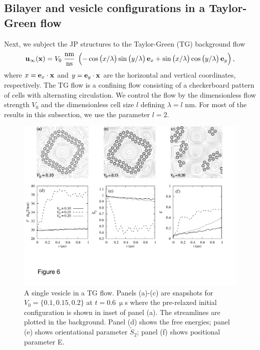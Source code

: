 \documentclass[prb,preprint,showpacs,preprintnumbers,amsmath,amssymb,longbibliography]{revtex4-1}
\newcommand{\xx}{\mathbf{x}}
\newcommand{\uu}{\mathbf{u}}
\begin{document}
\subsection{Bilayer and vesicle configurations in a Taylor-Green flow}
Next, we subject the JP structures to the Taylor-Green (TG) background
flow
\begin{equation}
\label{eq:tg_flow}
\uu_\infty(\xx) = V_0\; \frac{\text{nm}}{\text{ns}}\;
\left(
-\cos\left(x/\lambda\right)
 \sin\left(y/\lambda\right)
         {\bf e}_x
         +\sin\left(x/\lambda\right)
         \cos\left(y/\lambda\right)
             {\bf e}_y\right),
\end{equation}
where $x = {\bf e}_x \cdot \xx$ and $y = {\bf e}_y \cdot \xx$
are the horizontal and vertical coordinates, respectively. 
The TG flow is a confining flow consisting of a checkerboard pattern
of cells with alternating circulation. We control the flow by the
dimensionless flow strength $V_0$ and the dimensionless cell size $l$
defining $\lambda = l$ nm. For most of the results in this subsection,
we use the parameter $l=2$.
%

\begin{figure}
  \begin{center}
    \includegraphics[width=1.0\textwidth]{Figures/Figure6.pdf}        
  \end{center}
\caption{\label{fig:ves_TG} A single vesicle in a TG flow. Panels
  (a)-(c) are snapshots for $V_0=\{0.1, 0.15, 0.2\}$ at $t=0.6\ \upmu$s
  where the pre-relaxed initial configuration is shown in inset of panel
  (a). The streamlines are plotted in the background. Panel (d) shows
  the free energies; panel (e) shows orientational parameter
  $\tilde{S}_2$; panel (f) shows positional parameter E.}
\end{figure}
\end{document}
